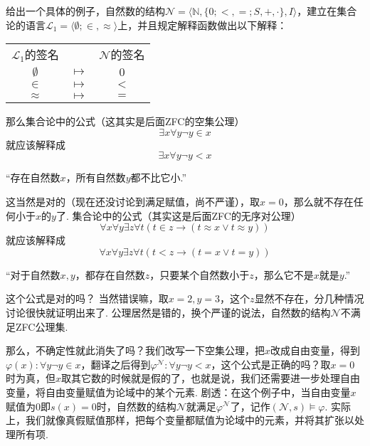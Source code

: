 \documentclass[main.tex]{subfiles}
\begin{document}
给出一个具体的例子，自然数的结构\(\mathcal{N} = \langle \mathbb{N}, \{0; <, =; S,+,\cdot\}, I \rangle\)，建立在集合论的语言\(\mathcal{L}_1 = \langle \emptyset; \in, \approx \rangle\)上，并且规定解释函数做出以下解释：
\begin{center}
    \begin{tabular}{ccc}
        \(\mathcal{L}_1\)的签名 & & \(\mathcal{N}\)的签名 \\
        \(\emptyset\) & \(\longmapsto\) & \(0\) \\
        \(\in\) & \(\longmapsto\) & \(<\) \\
        \(\approx\) & \(\longmapsto\) & \(=\)
    \end{tabular}
\end{center}
那么集合论中的公式（这其实是后面\textsf{ZFC}的空集公理）
\[\exists x \forall y \neg y \in x\]
就应该解释成
\[\exists x \forall y \neg y < x\]
\begin{center}
    “存在自然数\(x\)，所有自然数\(y\)都不比它小.”
\end{center}
这当然是对的（现在还没讨论到满足赋值，尚不严谨），取\(x=0\)，那么就不存在任何小于\(x\)的\(y\)了. 集合论中的公式（其实这是后面\textsf{ZFC}的无序对公理）
\[\forall x \forall y \exists z \forall t(t \in z \to (t \approx x \vee t \approx y))\]
就应该解释成
\[\forall x \forall y \exists z \forall t(t < z \to (t = x \vee t = y))\]
\begin{center}
    “对于自然数\(x,y\)，都存在自然数\(z\)，只要某个自然数小于\(z\)，那么它不是\(x\)就是\(y\).”
\end{center}
这个公式是对的吗？ 当然错误嘛，取\(x=2,y=3\)，这个\(z\)显然不存在，分几种情况讨论很快就证明出来了. 公理居然是错的，换个严谨的说法，自然数的结构\(\mathcal{N}\)不满足\textsf{ZFC}公理集. 

\vspace{1cm}

那么，不确定性就此消失了吗？我们改写一下空集公理，把\(x\)改成自由变量，得到\(\varphi(x): \forall y \neg y \in x\)，翻译之后得到\(\varphi^\mathcal{N}: \forall y \neg y < x\)，这个公式是正确的吗？取\(x=0\)时为真，但\(x\)取其它数的时候就是假的了，也就是说，我们还需要进一步处理自由变量，将自由变量赋值为论域中的某个元素. 剧透：在这个例子中，当自由变量\(x\)赋值为\(0\)即\(s(x)=0\)时，自然数的结构\(\mathcal{{N}}\)就满足\(\varphi^\mathcal{N}\)了，记作\((\mathcal{N},s) \vDash \varphi\). 实际上，我们就像真假赋值那样，把每个变量都赋值为论域中的元素，并将其扩张以处理所有项.
\end{document}
